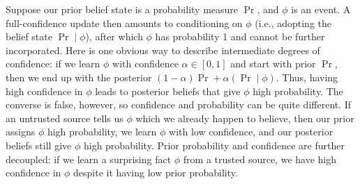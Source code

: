 \begin{example} \label{ex:prob-simple}
Suppose our prior belief state is a probability measure $\Pr$, and $\phi$ is an event. 
A full-confidence update then amounts to conditioning on $\phi$ (i.e., adopting the belief state $\Pr\mid\phi$), after which $\phi$ has probability 1 and cannot be further incorporated.
Here is one obvious way
to describe intermediate degrees of confidence:
if we learn $\phi$ with confidence
$\alpha \in [0,1]$
and start with prior $\Pr$, then we end up with the
posterior $(1-\alpha)\Pr + \alpha (\Pr\mid \phi)$.
%
Thus, having high confidence in $\phi$ leads to posterior beliefs that give $\phi$
high probability.
The converse is false, however, so
confidence and probability can be quite different.
If an untrusted source tells us $\phi$ which we already happen to believe, 
then our prior assigns $\phi$ high probability,
we learn $\phi$ with low confidence,
and our posterior beliefs still give $\phi$ high probability.  
Prior probability and confidence are further decoupled:
if we learn a surprising fact $\phi$ from a trusted source, we have high confidence in $\phi$ despite it having low prior probability.
\end{example}

